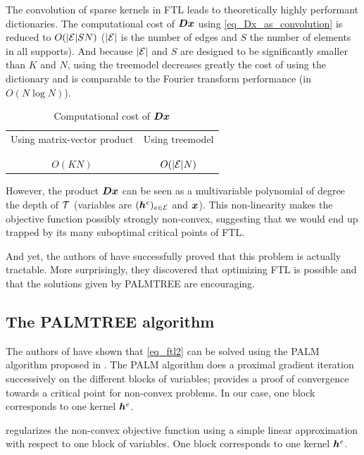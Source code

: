 The convolution of sparse kernels in \ac{FTL} leads to theoretically highly performant dictionaries. The computational cost of $\bm{D}\bm{x}$ using \cref{eq_Dx_as_convolution} is reduced to $O(|\mathcal E| S N)$ ($|\mathcal E|$ is the number of edges and $S$ the number of elements in all supports). And because $|\mathcal E|$ and $S$ are designed to be significantly smaller than $K$ and $N$, using the \gls{treemodel} decreases greatly the cost of using the dictionary and is comparable to the Fourier transform performance (in $O(N \log N)$).

\begin{table}[!ht] \centering 
\caption{Computational cost of $\bm{D}\bm{x}$} \label{table_comparison_Dx_costs}
\begin{tabular}{c|c}
Using matrix-vector product & Using \gls{treemodel} \\\\ \hline \\
$O(KN)$ & $O(|\mathcal E|N)$
\end{tabular}
\end{table}


However, the product $\bm{D}\bm{x}$ can be seen as a multivariable polynomial of degree the depth of $\mathcal T$ (variables are $(\bm{h}^e)_{e \in \mathcal E}$ and $\bm{x}$). This non-linearity makes the objective function possibly strongly non-convex, suggesting that we would end up trapped by its many suboptimal critical points of \ac{FTL}.

And yet, the authors of \cite{chabiron_optimization_2016} have successfully proved that this problem is actually tractable. More surprisingly, they discovered that optimizing \ac{FTL} is possible and that the solutions given by \acs{PALMTREE} are encouraging.


\subsection{The PALMTREE algorithm}\label{sec_palmtree}

The authors of \cite{chabiron_optimization_2016} have shown that \eqref{eq_ftl2} can be solved using the \ac{PALM} algorithm proposed in \cite{bolte_proximal_2014}. The \ac{PALM} algorithm does a proximal gradient iteration successively on the different blocks of variables; \cite{bolte_proximal_2014} provides a proof of convergence towards a critical point for non-convex problems. In our case, one block corresponds to one kernel $\bm{h}^e$.


regularizes the non-convex objective function using a simple linear approximation with respect to one block of variables. One block corresponds to one kernel $\bm{h}^e$.

